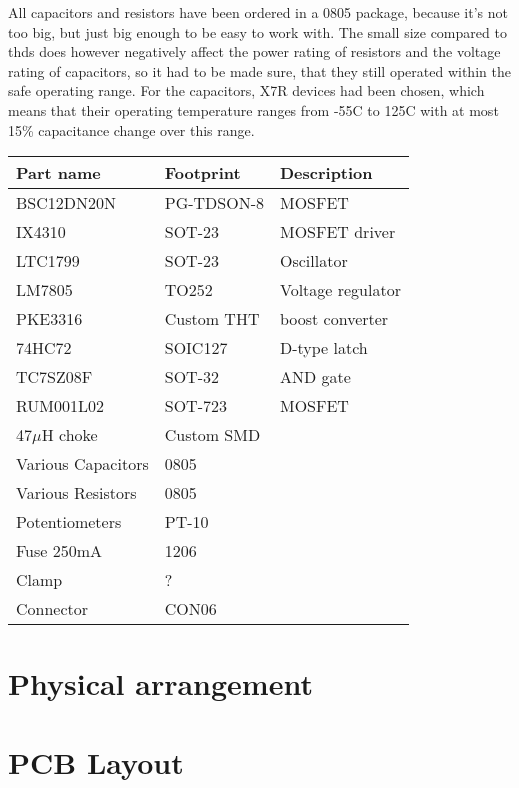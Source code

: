 All capacitors and resistors have been ordered in a 0805 package, because it's not too big, but just big enough to be easy to work with. The small size compared to \glspl{thd} does however negatively affect the power rating of resistors and the voltage rating of capacitors, so it had to be made sure, that they still operated within the safe operating range. For the capacitors, X7R devices had been chosen, which means that their operating temperature ranges from -55\textdegree C to 125\textdegree C with at most 15\% capacitance change over this range\textsuperscript{}.






\begin{tabular}{@{}lll@{}}
    \toprule
    \textbf{Part name} & \textbf{Footprint} & \textbf{Description}\\\midrule
    BSC12DN20N & PG-TDSON-8 & MOSFET\\
    IX4310 & SOT-23 & MOSFET driver\\
    LTC1799 & SOT-23 & Oscillator\\
    LM7805 & TO252 & Voltage regulator\\
    PKE3316 & Custom THT & boost converter\\
    74HC72 & SOIC127 & D-type latch\\
    TC7SZ08F & SOT-32 & AND gate\\
    RUM001L02 & SOT-723 & MOSFET\\
    47\(\mu\)H choke & Custom SMD &\\
    Various Capacitors & 0805 &\\
    Various Resistors & 0805 &\\
    Potentiometers & PT-10&\\
    Fuse 250mA & 1206 &\\
    Clamp & ? &\\
    Connector & CON06 &\\
    \bottomrule
\end{tabular}

\section{Physical arrangement}



\section{PCB Layout}

